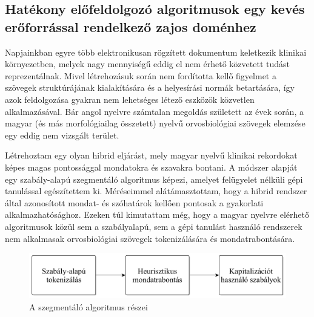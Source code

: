 \subsection{Hatékony előfeldolgozó algoritmusok egy kevés erőforrással rendelkező zajos doménhez}
\label{thes:clin}

Napjainkban egyre több elektronikusan rögzített dokumentum keletkezik klinikai környezetben, melyek nagy mennyiségű eddig el nem érhető közvetett tudást reprezentálnak. 
Mivel létrehozásuk során nem fordította kellő figyelmet a szövegek struktúrájának kialakítására és a helyesírási normák betartására, így azok feldolgozása gyakran nem lehetséges létező eszközök közvetlen alkalmazásával. 
Bár angol nyelvre számtalan megoldás született az évek során, a magyar (és más morfológiailag összetett) nyelvű orvosbiológiai szövegek elemzése egy eddig nem vizsgált terület.

% 
% 



\begin{core}
\begin{thesis}%
\label{thes:clin-segment}
Létrehoztam egy olyan hibrid eljárást, mely magyar nyelvű klinikai rekordokat képes magas pontossággal mondatokra és szavakra bontani. 
A módszer alapját egy szabály-alapú szegmentáló algoritmus képezi, amelyet felügyelet nélküli gépi tanulással egészítettem ki. %
Méréseimmel alátámasztottam, hogy a hibrid rendszer által azonosított mondat- és szóhatárok kellően pontosak a gyakorlati alkalmazhatósághoz.
Ezeken túl kimutattam még, hogy a magyar nyelvre elérhető algoritmusok közül sem a szabályalapú, sem a gépi tanulást használó rendszerek nem alkalmasak orvosbiológiai szövegek tokenizálására és mondatrabontására.
\end{thesis}

\begin{pub}
\cite{Orosz2013d, Orosz2014a}
\end{pub}
\end{core}


\begin{figure}[H] %
  \centering
  \includegraphics[scale=0.16]{Clinical/clin_segm_arch_hu.png} 
  \caption{A szegmentáló algoritmus részei}
  \label{fig:clin-segment-arch_en}
\end{figure}


